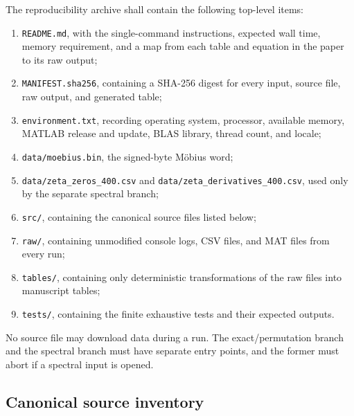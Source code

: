 \documentclass[11pt,reqno]{amsart}
\numberwithin{equation}{section}
\theoremstyle{plain}
\theoremstyle{definition}
\theoremstyle{remark}
\begin{document}
The reproducibility archive shall contain the following top-level items:
\begin{enumerate}[label=(\roman*)]
\item \texttt{README.md}, with the single-command instructions, expected wall
time, memory requirement, and a map from each table and equation in the paper
to its raw output;
\item \texttt{MANIFEST.sha256}, containing a SHA-256 digest for every input,
source file, raw output, and generated table;
\item \texttt{environment.txt}, recording operating system, processor,
available memory, MATLAB release and update, BLAS library, thread count, and
locale;
\item \texttt{data/moebius.bin}, the signed-byte M\"obius word;
\item \texttt{data/zeta\_zeros\_400.csv} and
\texttt{data/zeta\_derivatives\_400.csv}, used only by the separate spectral
branch;
\item \texttt{src/}, containing the canonical source files listed below;
\item \texttt{raw/}, containing unmodified console logs, CSV files, and MAT
files from every run;
\item \texttt{tables/}, containing only deterministic transformations of the
raw files into manuscript tables;
\item \texttt{tests/}, containing the finite exhaustive tests and their
expected outputs.
\end{enumerate}
No source file may download data during a run.  The exact/permutation branch
and the spectral branch must have separate entry points, and the former must
abort if a spectral input is opened.

\subsection{Canonical source inventory}
\label{subsec:source-inventory}
\end{document}
